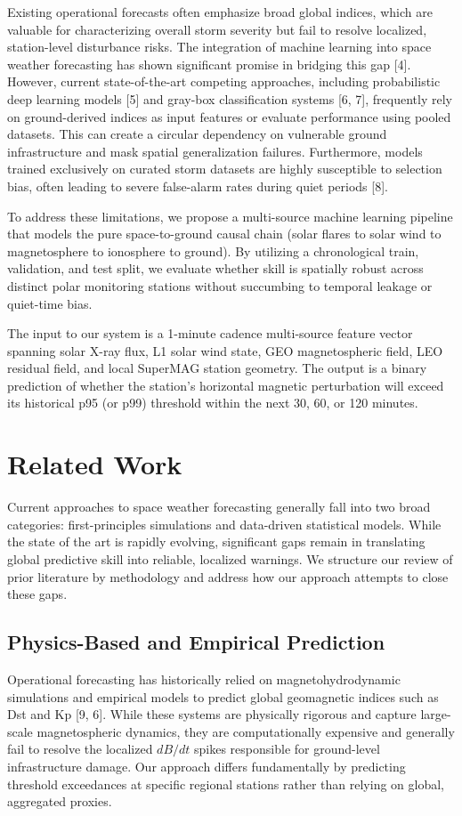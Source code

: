 \documentclass[conference]{IEEEtran}
\begin{document}
Existing operational forecasts often emphasize broad global indices, which are valuable for characterizing overall storm severity but fail to resolve localized, station-level disturbance risks. The integration of machine learning into space weather forecasting has shown significant promise in bridging this gap [4]. However, current state-of-the-art competing approaches, including probabilistic deep learning models [5] and gray-box classification systems [6, 7], frequently rely on ground-derived indices as input features or evaluate performance using pooled datasets. This can create a circular dependency on vulnerable ground infrastructure and mask spatial generalization failures. Furthermore, models trained exclusively on curated storm datasets are highly susceptible to selection bias, often leading to severe false-alarm rates during quiet periods [8].

To address these limitations, we propose a multi-source machine learning pipeline that models the pure space-to-ground causal chain (solar flares to solar wind to magnetosphere to ionosphere to ground). By utilizing a chronological train, validation, and test split, we evaluate whether skill is spatially robust across distinct polar monitoring stations without succumbing to temporal leakage or quiet-time bias.

The input to our system is a 1-minute cadence multi-source feature vector spanning solar X-ray flux, L1 solar wind state, GEO magnetospheric field, LEO residual field, and local SuperMAG station geometry. The output is a binary prediction of whether the station's horizontal magnetic perturbation will exceed its historical p95 (or p99) threshold within the next 30, 60, or 120 minutes.

\section{Related Work}

Current approaches to space weather forecasting generally fall into two broad categories: first-principles simulations and data-driven statistical models. While the state of the art is rapidly evolving, significant gaps remain in translating global predictive skill into reliable, localized warnings. We structure our review of prior literature by methodology and address how our approach attempts to close these gaps.

\subsection{Physics-Based and Empirical Prediction}
Operational forecasting has historically relied on magnetohydrodynamic simulations and empirical models to predict global geomagnetic indices such as Dst and Kp [9, 6]. While these systems are physically rigorous and capture large-scale magnetospheric dynamics, they are computationally expensive and generally fail to resolve the localized $dB/dt$ spikes responsible for ground-level infrastructure damage. Our approach differs fundamentally by predicting threshold exceedances at specific regional stations rather than relying on global, aggregated proxies.
\end{document}
